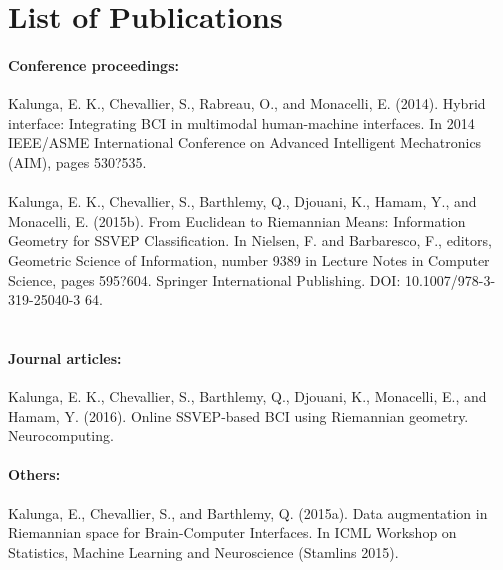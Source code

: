 
\chapter*{List of Publications}
\label{chap:publications}

\subsubsection*{Conference proceedings:}

Kalunga, E. K., Chevallier, S., Rabreau, O., and Monacelli, E. (2014). 
Hybrid interface: Integrating BCI in multimodal human-machine interfaces. 
In 2014 IEEE/ASME International Conference on Advanced Intelligent Mechatronics (AIM), pages 530?535. \\ \\
Kalunga, E. K., Chevallier, S., Barthlemy, Q., Djouani, K., Hamam, Y., and
Monacelli, E. (2015b). From Euclidean to Riemannian Means: Information
Geometry for SSVEP Classification. In Nielsen, F. and Barbaresco, F.,
editors, Geometric Science of Information, number 9389 in Lecture Notes in
Computer Science, pages 595?604. Springer International Publishing. DOI:
10.1007/978-3-319-25040-3 64. \\ \\

\subsubsection*{Journal articles:}
Kalunga, E. K., Chevallier, S., Barthlemy, Q., Djouani, K., Monacelli, E., and
Hamam, Y. (2016). Online SSVEP-based BCI using Riemannian geometry.
Neurocomputing.

\subsubsection*{Others:}
Kalunga, E., Chevallier, S., and Barthlemy, Q. (2015a). Data augmentation
in Riemannian space for Brain-Computer Interfaces. In ICML Workshop on
Statistics, Machine Learning and Neuroscience (Stamlins 2015).\\ \\
